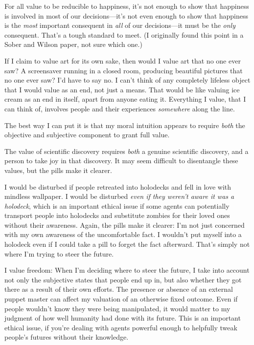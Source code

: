 {
 For all value to be reducible to happiness, it's
not enough to show that happiness is involved in most of our
decisions---it's not even enough to show that happiness
is the \textit{most} important consequent in \textit{all} of our
decisions---it must be the \textit{only} consequent.
That's a tough standard to meet. (I originally found
this point in a Sober and Wilson paper, not sure which one.)}

{
 If I claim to value art for its own sake, then would I value art
that no one ever saw? A screensaver running in a closed room, producing
beautiful pictures that no one ever saw? I'd have to
say no. I can't think of any completely lifeless object
that I would value as an end, not just a means. That would be like
valuing ice cream as an end in itself, apart from anyone eating it.
Everything I value, that I can think of, involves people and their
experiences \textit{somewhere} along the line.}

{
 The best way I can put it is that my moral intuition appears to
require \textit{both} the objective and subjective component to grant
full value.}

{
 The value of scientific discovery requires \textit{both} a genuine
scientific discovery, and a person to take joy in that discovery. It
may seem difficult to disentangle these values, but the pills make it
clearer.}

{
 I would be disturbed if people retreated into holodecks and fell
in love with mindless wallpaper. I would be disturbed \textit{even if
they weren't aware it was a holodeck}, which is an
important ethical issue if some agents can potentially transport people
into holodecks and substitute zombies for their loved ones without
their awareness. Again, the pills make it clearer: I'm
not just concerned with my own awareness of the uncomfortable fact. I
wouldn't put myself into a holodeck even if I could
take a pill to forget the fact afterward. That's simply
not where I'm trying to steer the future.}

{
 I value freedom: When I'm deciding where to steer
the future, I take into account not only the subjective states that
people end up in, but also whether they got there as a result of their
own efforts. The presence or absence of an external puppet master can
affect my valuation of an otherwise fixed outcome. Even if people
wouldn't know they were being manipulated, it would
matter to my judgment of how well humanity had done with its future.
This is an important ethical issue, if you're dealing
with agents powerful enough to helpfully tweak people's
futures without their knowledge.}

